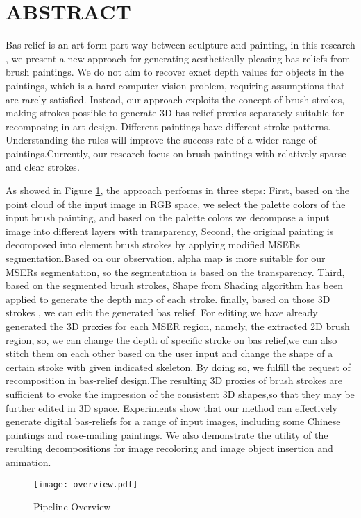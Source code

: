 \section*{\centering ABSTRACT}

Bas-relief is an art form part way between sculpture and painting, in this research , we present a new approach for generating aesthetically pleasing bas-reliefs from brush paintings. We do not aim to recover exact depth values for objects in the paintings, which is a hard computer vision problem, requiring assumptions that are rarely satisfied. Instead, our approach exploits the concept of brush strokes, making strokes possible to generate 3D bas relief proxies separately suitable for recomposing in art design. Different paintings have different stroke patterns. Understanding the rules will improve the success rate of a wider range of paintings.Currently, our research focus on brush paintings with relatively sparse and clear strokes. 

As showed in Figure \ref{pip}, the approach performs in three steps: First,  based on the point cloud of the input image in RGB space, we select the palette colors of the input brush painting, and based on the palette colors we decompose a input image into different layers with transparency,  Second,  the original painting is decomposed into element brush strokes by applying modified MSERs segmentation.Based on our observation, alpha map is more suitable for our MSERs segmentation, so the segmentation is based on the transparency. Third, based on the segmented brush strokes,  Shape from Shading algorithm has been applied to generate the depth map of each stroke.  finally, based on those 3D strokes , we can edit the generated bas relief. For editing,we have already generated the 3D proxies for each MSER region, namely, the extracted 2D brush region, so, we can change the depth of specific stroke on bas relief,we can also stitch them on each other based on the user input and change the shape of a certain stroke with given indicated skeleton. By doing so, we fulfill the request of recomposition in bas-relief design.The resulting 3D proxies of brush strokes are sufficient to evoke the impression of the consistent 3D shapes,so that they may be further edited in 3D space. 
Experiments show that our method can effectively generate digital bas-reliefs for a range of input images, including some Chinese paintings and rose-mailing paintings.
We also demonstrate the utility of the resulting decompositions for image recoloring and image object insertion and animation.

\begin{figure}[H]
\centering
\texttt{[image: overview.pdf]}
\caption{Pipeline Overview}
\label{pip}
\end{figure} 
 
\newpage


 

